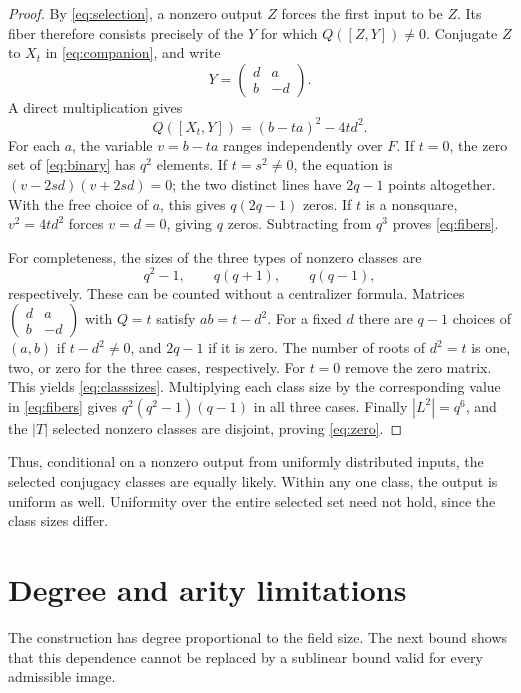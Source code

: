 \documentclass[11pt]{article}
\begin{document}
\begin{proof}
By \eqref{eq:selection}, a nonzero output $Z$ forces the first input to be
$Z$. Its fiber therefore consists precisely of the $Y$ for which
$Q([Z,Y])\neq0$. Conjugate $Z$ to $X_t$ in \eqref{eq:companion}, and write
\[
 Y=\begin{pmatrix}d&a\\b&-d\end{pmatrix}.
\]
A direct multiplication gives
\begin{equation}\label{eq:binary}
 Q([X_t,Y])=(b-ta)^2-4td^2.
\end{equation}
For each $a$, the variable $v=b-ta$ ranges independently over $F$.
If $t=0$, the zero set of \eqref{eq:binary} has $q^2$ elements.
If $t=s^2\neq0$, the equation is $(v-2sd)(v+2sd)=0$; the two distinct
lines have $2q-1$ points altogether. With the free choice of $a$, this
gives $q(2q-1)$ zeros. If $t$ is a nonsquare, $v^2=4td^2$ forces $v=d=0$,
giving $q$ zeros. Subtracting from $q^3$ proves \eqref{eq:fibers}.

For completeness, the sizes of the three types of nonzero classes are
\begin{equation}\label{eq:classsizes}
 q^2-1,\qquad q(q+1),\qquad q(q-1),
\end{equation}
respectively. These can be counted without a centralizer formula. Matrices
$\left(\begin{smallmatrix}d&a\\b&-d\end{smallmatrix}\right)$ with
$Q=t$ satisfy $ab=t-d^2$. For a fixed $d$ there are $q-1$ choices of $(a,b)$
if $t-d^2\neq0$, and $2q-1$ if it is zero. The number of roots of $d^2=t$
is one, two, or zero for the three cases, respectively. For $t=0$ remove
the zero matrix. This yields \eqref{eq:classsizes}.
Multiplying each class size by the corresponding value in \eqref{eq:fibers}
gives $q^2(q^2-1)(q-1)$ in all three cases. Finally $|L^2|=q^6$, and the
$|T|$ selected nonzero classes are disjoint, proving \eqref{eq:zero}.
\end{proof}

Thus, conditional on a nonzero output from uniformly distributed inputs,
the selected conjugacy classes are equally likely. Within any one class,
the output is uniform as well. Uniformity over the entire selected set
need not hold, since the class sizes differ.

\section{Degree and arity limitations}
The construction has degree proportional to the field size. The next
bound shows that this dependence cannot be replaced by a sublinear bound
valid for every admissible image.
\end{document}
